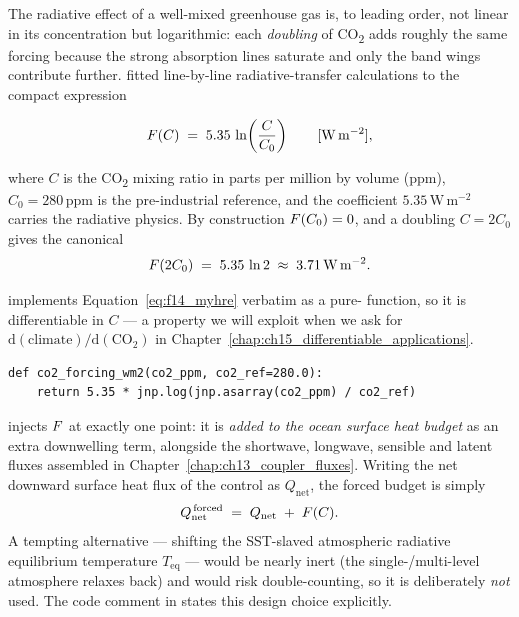 The radiative effect of a well-mixed greenhouse gas is, to leading order, not
linear in its concentration but logarithmic: each \emph{doubling} of
CO\textsubscript{2} adds roughly the same forcing because the strong absorption
lines saturate and only the band wings contribute further. \citet{myhre1998}
fitted line-by-line radiative-transfer calculations to the compact expression

\begin{equation}
  F(C) \;=\; 5.35 \,\ln\!\left(\frac{C}{C_0}\right)
  \qquad [\mathrm{W\,m^{-2}}],
  \label{eq:f14_myhre}
\end{equation}

where $C$ is the CO\textsubscript{2} mixing ratio in parts per million by volume
(ppm), $C_0=280\,\mathrm{ppm}$ is the pre-industrial reference, and the
coefficient $5.35\,\mathrm{W\,m^{-2}}$ carries the radiative physics. By
construction $F(C_0)=0$, and a doubling $C=2C_0$ gives the canonical
\begin{equation}
  F(2C_0) \;=\; 5.35\,\ln 2 \;\approx\; 3.71\,\mathrm{W\,m^{-2}}.
  \label{eq:f14_2x}
\end{equation}

\model{} implements Equation~\eqref{eq:f14_myhre} verbatim as a pure-\jax{}
function, so it is differentiable in $C$ --- a property we will exploit when we
ask for $\mathrm{d}(\text{climate})/\mathrm{d}(\text{CO}_2)$ in
Chapter~\ref{chap:ch15_differentiable_applications}.

\begin{lstlisting}[caption={Myhre forcing, the single radiative channel.}]
def co2_forcing_wm2(co2_ppm, co2_ref=280.0):
    return 5.35 * jnp.log(jnp.asarray(co2_ppm) / co2_ref)
\end{lstlisting}

\begin{remark}
\model{} injects $F$ at exactly one point: it is \emph{added to the ocean
surface heat budget} as an extra downwelling term, alongside the shortwave,
longwave, sensible and latent fluxes assembled in
Chapter~\ref{chap:ch13_coupler_fluxes}. Writing the net downward surface heat
flux of the control as $Q_{\mathrm{net}}$, the forced budget is simply
\begin{equation}
  Q_{\mathrm{net}}^{\,\mathrm{forced}} \;=\; Q_{\mathrm{net}} \;+\; F(C).
  \label{eq:f14_inject}
\end{equation}
A tempting alternative --- shifting the SST-slaved atmospheric radiative
equilibrium temperature $T_{\mathrm{eq}}$ --- would be nearly inert (the
single-/multi-level atmosphere relaxes back) and would risk double-counting, so
it is deliberately \emph{not} used. The code comment in
 states this design choice explicitly.
\end{remark}

